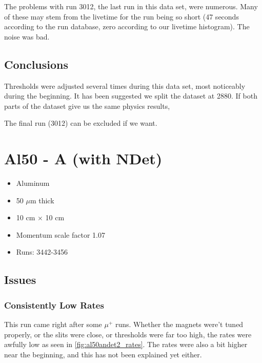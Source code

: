 \documentclass[a4paper]{article}
\begin{document}
The problems with run 3012, the last run in this data set, were numerous. Many of these may stem
from the livetime for the run being so short (47 seconds according to the run database, zero according
to our livetime histogram). The noise was bad.


\subsection{Conclusions}

Thresholds were adjusted several times during this data set, most noticeably during the beginning.
It has been suggested we split the dataset at 2880. If both parts of the dataset give us the same physics results, 

The final run (3012) can be excluded if we want.


\section{Al50 - A (with NDet)}
\begin{itemize}
  \item Aluminum
  \item 50 $\mu$m thick
  \item 10 cm $\times$ 10 cm
  \item Momentum scale factor 1.07
  \item Runs: 3442-3456
\end{itemize}

\subsection{Issues}
\subsubsection{Consistently Low Rates}
\label{sec:al50andet2_rates}

This run came right after some $\mu^+$ runs. Whether the magnets were't tuned properly, or the slits were close, or thresholds were far too
high, the rates were awfully low as seen in \ref{fig:al50andet2_rates}. The rates were also a bit higher near the beginning, and
this has not been explained yet either.
\end{document}
